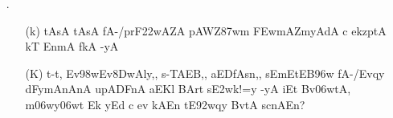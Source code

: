 \begin{itemize}
\begin{itemize}
               \item[({\dn G})] {\dn Ev\38DwAET\0n, s\2-tA@yyno\306wKA EvDA\2 CA/E\381w{\rs ,\re}\break En,SkA@yyn En\0SyA BojnAvAs\326wyv-TA\break i(y\?v\-mAdFEn kAEn sADnAEn aA\399wEy aAv\35BwykAEn{\rs ?\re}}
               
               \item[({\dn R})] {\dn CA/E\381w{\rs -\re}En,SkA@yynAEdk aASy\2 BvtA\2 \3FEwd\?f\? upl<y{\rs -\re}mAn\2 Bv\306wmtAsAr\?Z pyA\0\3D8w\2 n}
                             
               \end{itemize}
               
  \item[{\dn \dnnum \rn{33}}.] \begin{itemize}
  
            \item[({\dn k})] {\dn tAsA\2 tAsA\2 fA-/prF\322wAZA\2 pAWZ\387wm\? \3FEwmAZ\-myA\0dA c ekzptA kT\2 EnmA\0\2 fkA -yA}
            
            \item[({\dn K})] {\dn t\4-t\4, Ev\398wEv\38DwAly\4,{\rs ,\re} s\2-TAEB,{\rs ,\re} aEDfAsn\4,{\rs ,\re} sEmEtEB\396w fA-/Evqy\? dFymAnAnA upADFnA aEKl\? BArt\? s\3E2wk!=y\2 -yA iEt Bv\306wtA, m\306wy\306wt\? Ek yEd c ev kAEn tE\392wqy\? BvtA\2 s\2cnAEn{\rs ?\re} }
  
            \end{itemize}                                           
\end{itemize}

